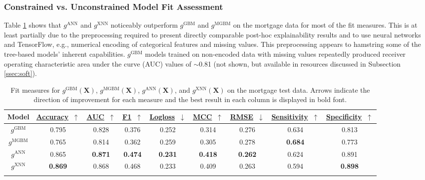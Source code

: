 \documentclass[information,article,submit,moreauthors,pdftex]{definitions/mdpi}
\begin{document}
\subsubsection{Constrained vs. Unconstrained Model Fit Assessment}\label{ssec:c_v_uc_mort}

Table \ref{tab:mort_acc} shows that $g^\text{ANN}$ and $g^\text{XNN}$ noticeably outperform $g^\text{GBM}$ and $g^\text{MGBM}$ on the mortgage data for most of the fit measures. This is at least partially due to the preprocessing required to present directly comparable post-hoc explainability results and to use neural networks and TensorFlow, e.g., numerical encoding of categorical features and missing values. This preprocessing appears to hamstring some of the tree-based models' inherent capabilities. $g^\text{GBM}$ models trained on non-encoded data with missing values repeatedly produced receiver operating characteristic area under the curve (AUC) values of $\sim$0.81 (not shown, but available in resources discussed in Subsection \ref{ssec:soft}). 

\begin{table}[htb]
	\caption{Fit measures for $g^\text{GBM}(\mathbf{X})$, $g^\text{MGBM}(\mathbf{X})$, $g^\text{ANN}(\mathbf{X})$, and $g^\text{XNN}(\mathbf{X})$ on the mortgage test data. Arrows indicate the direction of improvement for each measure and the best result in each column is displayed in bold font.}
\centering
\begin{tabular}{ccccccccc}
	\toprule
	\textbf{Model} & 
	\href{https://scikit-learn.org/stable/modules/model_evaluation.html#accuracy-score}{\textbf{Accuracy}}~$\uparrow$ & \href{https://en.wikipedia.org/wiki/Receiver_operating_characteristic#Area_under_the_curve}{\textbf{AUC}}~$\uparrow$ & \href{https://en.wikipedia.org/wiki/F1_score}{\textbf{F1}}~$\uparrow$ & 
	\href{https://scikit-learn.org/stable/modules/model_evaluation.html#log-loss}{\textbf{Logloss}}~$\downarrow$ & \href{https://en.wikipedia.org/wiki/Matthews_correlation_coefficient}{\textbf{MCC}}~$\uparrow$ & \href{https://en.wikipedia.org/wiki/Root-mean-square_deviation}{\textbf{RMSE}}~$\downarrow$ & \href{https://en.wikipedia.org/wiki/Sensitivity_and_specificity}{\textbf{Sensitivity}}~$\uparrow$ & \href{https://en.wikipedia.org/wiki/Sensitivity_and_specificity}{\textbf{Specificity}}~$\uparrow$ \\
	\midrule	
$g^\text{GBM}$		& 0.795	& 0.828	& 0.376 & 0.252 & 0.314 & 0.276 & 0.634 & 0.813 \\
$g^\text{MGBM}$		& 0.765	& 0.814	& 0.362 & 0.259 & 0.305 & 0.278 & \textbf{0.684} & 0.773 \\
$g^\text{ANN}$		& 0.865	& \textbf{0.871} & \textbf{0.474} & \textbf{0.231} & \textbf{0.418} & \textbf{0.262} & 0.624 & 0.891 \\
$g^\text{XNN}$		& \textbf{0.869} & 0.868 & 0.468 & 0.233 & 0.409 & 0.263 & 0.594 & \textbf{0.898} \\
\bottomrule
\label{tab:mort_acc}
\end{tabular}
\end{table}
\end{document}
